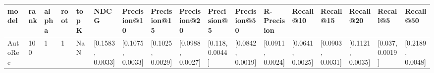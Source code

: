 \begin{tabular}{lllllllllllllllll}
\toprule
   model & rank & alpha & root & topK &              NDCG &      Precision@10 &      Precision@15 &      Precision@20 &      Precision@5 &      Precision@50 &       R-Precision &         Recall@10 &         Recall@15 &         Recall@20 &         Recall@5 &         Recall@50 \\
\midrule
 AutoRec &  100 &     1 &    1 &  NaN &  [0.1583, 0.0033] &  [0.1075, 0.0033] &  [0.1025, 0.0029] &  [0.0988, 0.0027] &  [0.118, 0.0044] &  [0.0842, 0.0019] &  [0.0911, 0.0024] &  [0.0641, 0.0025] &  [0.0903, 0.0031] &  [0.1121, 0.0035] &  [0.037, 0.0019] &  [0.2189, 0.0048] \\
\bottomrule
\end{tabular}
